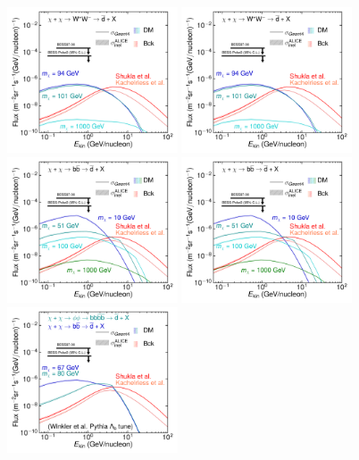 \begin{figure}
    \centering
    \includegraphics[width=0.45\textwidth]{figures/WWdbarPaperTOA.pdf}
    \includegraphics[width=0.45\textwidth]{figures/WWdbarPaperTOA.pdf}
    \includegraphics[width=0.45\textwidth]{figures/bbdbarPaperTOA.pdf}
    \includegraphics[width=0.45\textwidth]{figures/bbdbarPaperTOA.pdf}
    \includegraphics[width=0.45\textwidth]{figures/blambdadbarPaperTOA.pdf}

\end{figure}
